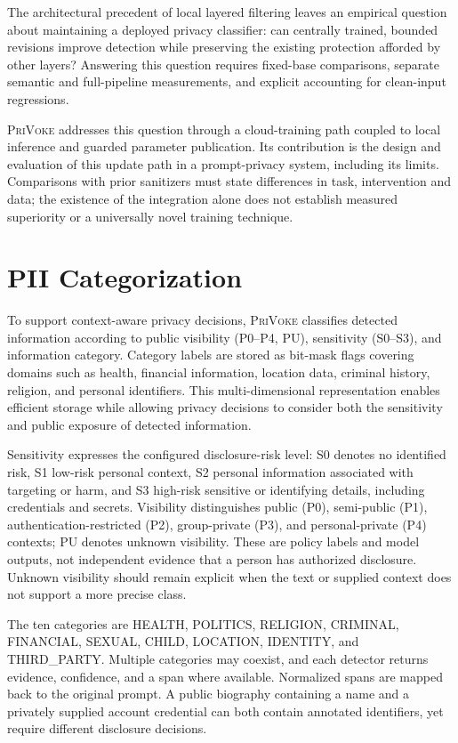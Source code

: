 \documentclass[conference]{IEEEtran}
\newcommand{\privoke}{\textsc{PriVoke}\xspace}
\begin{document}
The architectural precedent of local layered filtering leaves an empirical question about maintaining a deployed privacy classifier: can centrally trained, bounded revisions improve detection while preserving the existing protection afforded by other layers? Answering this question requires fixed-base comparisons, separate semantic and full-pipeline measurements, and explicit accounting for clean-input regressions.

\privoke addresses this question through a cloud-training path coupled to local inference and guarded parameter publication. Its contribution is the design and evaluation of this update path in a prompt-privacy system, including its limits. Comparisons with prior sanitizers must state differences in task, intervention and data; the existence of the integration alone does not establish measured superiority or a universally novel training technique.

\section{PII Categorization}
\label{sec:pii_categorisation}

To support context-aware privacy decisions, \privoke classifies detected information according to public visibility (P0--P4, PU), sensitivity (S0--S3), and information category. Category labels are stored as bit-mask flags covering domains such as health, financial information, location data, criminal history, religion, and personal identifiers. This multi-dimensional representation enables efficient storage while allowing privacy decisions to consider both the sensitivity and public exposure of detected information.

Sensitivity expresses the configured disclosure-risk level: S0 denotes no identified risk, S1 low-risk personal context, S2 personal information associated with targeting or harm, and S3 high-risk sensitive or identifying details, including credentials and secrets. Visibility distinguishes public (P0), semi-public (P1), authentication-restricted (P2), group-private (P3), and personal-private (P4) contexts; PU denotes unknown visibility. These are policy labels and model outputs, not independent evidence that a person has authorized disclosure. Unknown visibility should remain explicit when the text or supplied context does not support a more precise class.

The ten categories are HEALTH, POLITICS, RELIGION, CRIMINAL, FINANCIAL, SEXUAL, CHILD, LOCATION, IDENTITY, and THIRD\_PARTY. Multiple categories may coexist, and each detector returns evidence, confidence, and a span where available. Normalized spans are mapped back to the original prompt. A public biography containing a name and a privately supplied account credential can both contain annotated identifiers, yet require different disclosure decisions.
\end{document}
